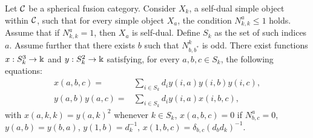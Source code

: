 \documentclass{amsart}
\begin{document}
\begin{theorem} \label{thm:loc}
Let $\mathcal{C}$ be a spherical fusion category. Consider $X_k$, a self-dual simple object within $\mathcal{C}$, such that for every simple object $X_a$, the condition $N_{k,k}^{a} \le 1$ holds. Assume that if $N_{k,k}^{a} = 1$, then $X_a$ is self-dual. Define $S_k$ as the set of such indices $a$.
Assume further that there exists $b$ such that $N_{b,b^*}^k$ is odd.
There exist functions $x:S_k^3\to\Bbbk$ and $y:S_k^2\to\Bbbk$ satisfying, for every $a,b,c\in S_k$, the following equations:
\begin{align}
\label{equ:Ibis} x(a,b,c)=  & \sum_{i \in S_k} d_i y(i,a)y(i,b)y(i,c), \\
\label{equ:IIbis} y(a,b)y(a,c) = & \sum_{i \in S_k} d_i y(i,a)x(i,b,c),
\end{align}
\noindent with $x(a,k,k) = y(a,k)^2$ whenever $k\in S_k$, $x(a,b,c) = 0$ if $N_{b,c}^a  =0$, $y(a,b) = y(b,a)$, $y(1,b) = d_k^{-1}$, $x(1,b,c) = \delta_{b,c} (d_bd_k)^{-1}$.
\end{theorem}
\end{document}
